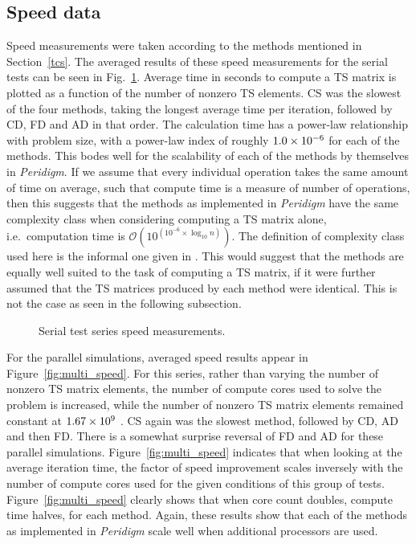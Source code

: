 \documentclass[preprint,12pt]{elsarticle}
\begin{document}
\subsection{Speed data} 
%
Speed measurements were taken according to the methods mentioned in Section~\ref{tcs}. The averaged results of these speed measurements for the serial tests can be seen in Fig.~\ref{fig:serial_speed}.  Average time in seconds to compute a TS matrix is plotted as a function of the number of nonzero TS elements.  CS was the slowest of the four methods, taking the longest average time per iteration, followed by CD, FD and AD in that order. The calculation time has a power-law relationship with problem size, with a power-law index of roughly $\num{1.0E-6}$ for each of the methods. This bodes well for the scalability of each of the methods by themselves in \emph{Peridigm}. If we assume that every individual operation takes the same amount of time on average, such that compute time is a measure of number of operations, then this suggests that the methods as implemented in \emph{Peridigm} have the same complexity class when considering computing a TS matrix alone, i.e.\ computation time is $\mathcal{O}(10^{(10^{-6} \times \log_{10}n)})$. The definition of complexity class used here is the informal one given in \cite[pp. 1059]{cormen2009introduction}. This would suggest that the methods are equally well suited to the task of computing a TS matrix, if it were further assumed that the TS matrices produced by each method were identical. This is not the case as seen in the following subsection.
%
\begin{figure}[tbp] 
    \centering 
    \scalebox{0.93}{}
    \caption{Serial test series speed measurements.} 
    \label{fig:serial_speed}
\end{figure}
%
For the parallel simulations, averaged speed results appear in Figure~\ref{fig:multi_speed}. For this series, rather than varying the number of nonzero TS matrix elements, the number of compute cores used to solve the problem is increased, while the number of nonzero TS matrix elements remained constant at $\num{1.67E9}$ .  CS again was the slowest method, followed by CD, AD and then FD.  There is a somewhat surprise reversal of FD and AD for these parallel simulations.  Figure~\ref{fig:multi_speed} indicates that when looking at the average iteration time, the factor of speed improvement scales inversely with the number of compute cores used for the given conditions of this group of tests. Figure~\ref{fig:multi_speed} clearly shows that when core count doubles, compute time halves, for each method. Again, these results show that each of the methods as implemented in \emph{Peridigm} scale well when additional processors are used. 
\end{document}
